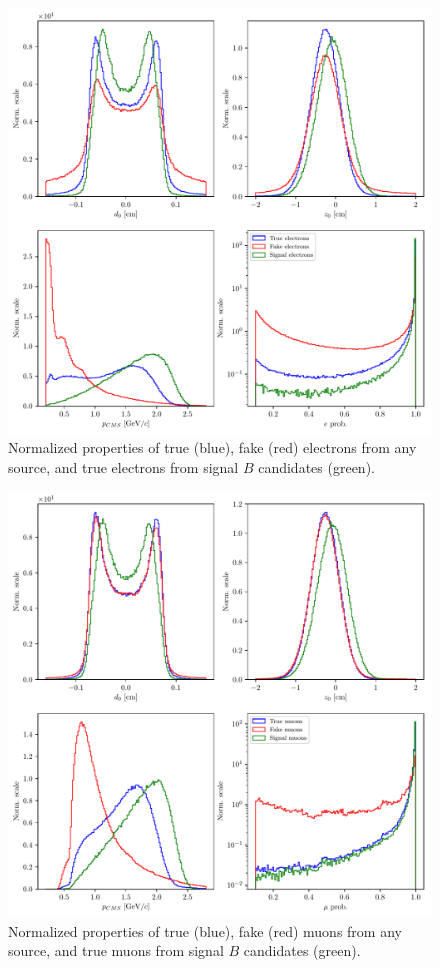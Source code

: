 \begin{figure}[H]
	\centering
	\includegraphics[width=\linewidth]{fig/FSP_e_vars}
	\captionsetup{width=.8\linewidth}
	\caption{Normalized properties of true (blue), fake (red) electrons from any source, and true electrons from signal $B$ candidates (green).}
	\label{fig:evars}
\end{figure}

\begin{figure}[H]
	\centering
	\includegraphics[width=\linewidth]{fig/FSP_mu_vars}
	\captionsetup{width=.8\linewidth}
	\caption{Normalized properties of true (blue), fake (red) muons from any source, and true muons from signal $B$ candidates (green).}
	\label{fig:muvars}
\end{figure}

